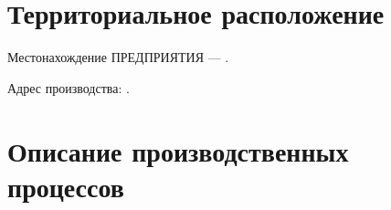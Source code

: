 \clearpage

\section{Территориальное расположение}
%

Местонахождение ПРЕДПРИЯТИЯ --- \CURADDRESS.

Адрес производства:
\ADDRESS.




\section{Описание производственных процессов}






























